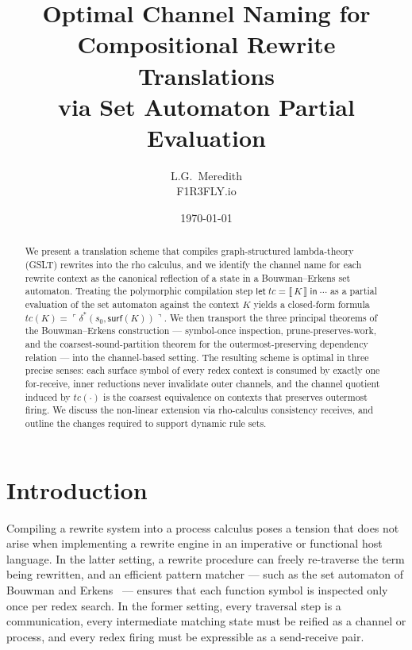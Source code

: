 \documentclass[11pt]{article}
\title{Optimal Channel Naming for Compositional Rewrite Translations\\
       via Set Automaton Partial Evaluation}
\author{L.G.~Meredith\\\small F1R3FLY.io}
\date{\today}
\theoremstyle{plain}
\theoremstyle{definition}
\theoremstyle{remark}
\newcommand{\sem}[1]{\llbracket\,#1\,\rrbracket}
\newcommand{\reflect}[1]{\ulcorner #1 \urcorner}
\newcommand{\surface}{\mathsf{surf}}
\newcommand{\Let}[3]{\mathsf{let}\;#1 = #2\;\mathsf{in}\;#3}
\begin{document}
\maketitle

\begin{abstract}
We present a translation scheme that compiles graph-structured lambda-theory
(GSLT) rewrites into the rho calculus, and we identify the channel name for
each rewrite context as the canonical reflection of a state in a Bouwman--Erkens
set automaton. Treating the polymorphic compilation step
$\Let{tc}{\sem{K}}{\cdots}$ as a partial evaluation of the set automaton
against the context $K$ yields a closed-form formula
$tc(K) = \reflect{\delta^{*}(s_{0}, \surface(K))}$. We then transport the
three principal theorems of the Bouwman--Erkens construction --- symbol-once
inspection, prune-preserves-work, and the coarsest-sound-partition theorem
for the outermost-preserving dependency relation --- into the channel-based
setting. The resulting scheme is optimal in three precise senses:
each surface symbol of every redex context is consumed by exactly one
\textsf{for}-receive, inner reductions never invalidate outer channels, and
the channel quotient induced by $tc(\cdot)$ is the coarsest equivalence on
contexts that preserves outermost firing. We discuss the non-linear
extension via rho-calculus consistency receives, and outline the changes
required to support dynamic rule sets.
\end{abstract}

\tableofcontents

\section{Introduction}\label{sec:intro}

Compiling a rewrite system into a process calculus poses a tension that does
not arise when implementing a rewrite engine in an imperative or functional
host language. In the latter setting, a rewrite procedure can freely re-traverse
the term being rewritten, and an efficient pattern matcher --- such as the
set automaton of Bouwman and Erkens~\cite{BouwmanErkens2022,ErkensGroote2021}
--- ensures that each function symbol is inspected only once per redex search.
In the former setting, every traversal step is a communication, every
intermediate matching state must be reified as a channel or process, and
every redex firing must be expressible as a send-receive pair.
\end{document}

